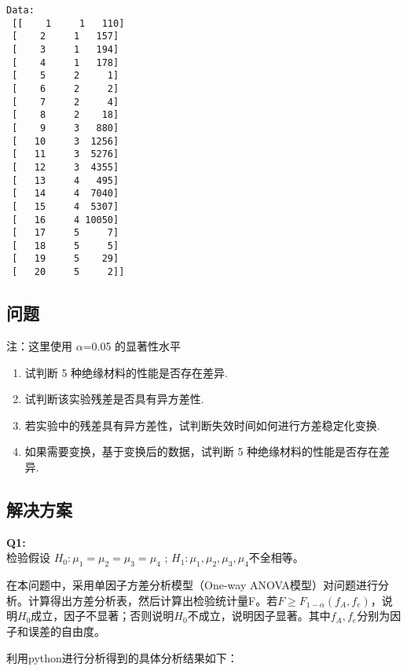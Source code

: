 \documentclass[11pt]{ctexart}
\providecommand{\tightlist}{%
      \setlength{\itemsep}{0pt}\setlength{\parskip}{0pt}}
\begin{document}
    \begin{Verbatim}[commandchars=\\\{\}]
Data:
 [[    1     1   110]
 [    2     1   157]
 [    3     1   194]
 [    4     1   178]
 [    5     2     1]
 [    6     2     2]
 [    7     2     4]
 [    8     2    18]
 [    9     3   880]
 [   10     3  1256]
 [   11     3  5276]
 [   12     3  4355]
 [   13     4   495]
 [   14     4  7040]
 [   15     4  5307]
 [   16     4 10050]
 [   17     5     7]
 [   18     5     5]
 [   19     5    29]
 [   20     5     2]]
    \end{Verbatim}

    \hypertarget{ux95eeux9898}{%
\subsection{问题}\label{ux95eeux9898}}

注：这里使用 \(\alpha\)=0.05 的显著性水平

\begin{enumerate}
\def\labelenumi{\arabic{enumi}.}
\tightlist
\item
  试判断 5 种绝缘材料的性能是否存在差异.
\item
  试判断该实验残差是否具有异方差性.
\item
  若实验中的残差具有异方差性，试判断失效时间如何进行方差稳定化变换.
\item
  如果需要变换，基于变换后的数据，试判断 5 种绝缘材料的性能是否存在差异.
\end{enumerate}

\hypertarget{ux89e3ux51b3ux65b9ux6848}{%
\subsection{解决方案}\label{ux89e3ux51b3ux65b9ux6848}}

\textbf{Q1:}\\
检验假设 \(H_0: \mu_1 = \mu_2 = \mu_3 = \mu_4\) ;
\(H_1: \mu_1, \mu_2, \mu_3, \mu_4\)不全相等。

在本问题中，采用单因子方差分析模型（One-way
ANOVA模型）对问题进行分析。计算得出方差分析表，然后计算出检验统计量F。若\(F\ge F_{1-\alpha}(f_A,f_e)\)，说明\(H_0\)成立，因子不显著；否则说明\(H_0\)不成立，说明因子显著。其中\(f_A,f_e\)分别为因子和误差的自由度。

利用python进行分析得到的具体分析结果如下：
\end{document}
